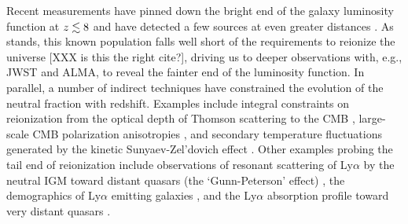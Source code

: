 \documentclass[twocolumn,numberedappendix]{emulateapj} \shorttitle{PSA64}
\begin{document}
Recent measurements
have pinned down the bright end of the galaxy luminosity function
at $z \lesssim 8$ \citep{bouwens_et_al2010,schenker_et_al2013} and have detected a few sources at even greater
distances \citep{ellis_et_al2013,oesch_et_al2013}. As stands, this known population falls well short 
of the requirements to reionize the universe \citep{robertson_et_al2013} [XXX is this the right cite?], 
driving us to deeper observations with, e.g., JWST and ALMA, to reveal the fainter end of the luminosity function.
In parallel, a number of indirect techniques have constrained the evolution of the neutral fraction
with redshift. Examples include integral constraints on reionization from the
optical depth of Thomson scattering to the CMB \citep{planck_et_al2014},
large-scale CMB polarization anisotropies \citep{page_et_al2007}, and
secondary temperature fluctuations generated by the kinetic Sunyaev-Zel'dovich effect \citep{zahn_et_al2012,mesinger_et_al2012}.
Other examples probing the tail end of reionization include
observations of resonant scattering of Ly$\alpha$ by the neutral IGM toward
distant quasars (the `Gunn-Peterson' effect) \citep{fan_et_al2006},
the demographics of Ly$\alpha$ emitting galaxies \citep{schenker_et_al2013,treu_et_al2013,Faisst_et_al2014},
and the
Ly$\alpha$ absorption profile toward very distant quasars \citep{bolton_et_al2011}.

\end{document}
